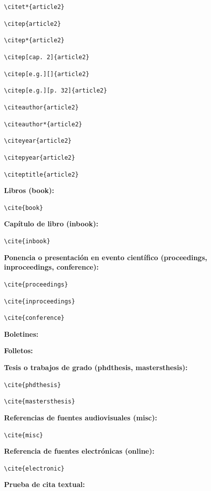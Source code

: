 \documentclass{uclamsc}
\begin{document}
\begin{contenido}
\verb;\citet*{article2}; \citet*{article2}

\verb;\citep{article2}; \citep{article2}

\verb;\citep*{article2}; \citep*{article2}

\verb;\citep[cap. 2]{article2}; \citep[cap. 2]{article2}

\verb;\citep[e.g.][]{article2}; \citep[e.g.][]{article2}

\verb;\citep[e.g.][p. 32]{article2}; \citep[e.g.][p. 32]{article2}

\verb;\citeauthor{article2}; \citeauthor{article2}

\verb;\citeauthor*{article2}; \citeauthor*{article2}

\verb;\citeyear{article2}; \citeyear{article2}

\verb;\citepyear{article2}; 

\verb;\citeptitle{article2}; 

\espaciodoble\textbf{Libros (book):}

\verb;\cite{book}; \cite{book}

\espaciodoble\textbf{Capítulo de libro (inbook):}

\verb;\cite{inbook}; \cite{inbook}

\espaciodoble\textbf{Ponencia o presentación en evento científico (proceedings, inproceedings, conference):}

\verb;\cite{proceedings}; \cite{proceedings}

\verb;\cite{inproceedings}; \cite{inproceedings}

\verb;\cite{conference}; \cite{conference}

\espaciodoble\textbf{Boletines:}

\espaciodoble\textbf{Folletos:}

\espaciodoble\textbf{Tesis o trabajos de grado (phdthesis, mastersthesis):}

\verb;\cite{phdthesis}; \cite{phdthesis}

\verb;\cite{mastersthesis}; \cite{mastersthesis}

\espaciodoble\textbf{Referencias de fuentes audiovisuales (misc):}

\verb;\cite{misc}; \cite{misc}


\espaciodoble\textbf{Referencia de fuentes electrónicas (online):}

\verb;\cite{electronic}; \cite{electronic}


\break

\espaciodoble\textbf{Prueba de cita textual:}


\end{contenido}
\end{document}
